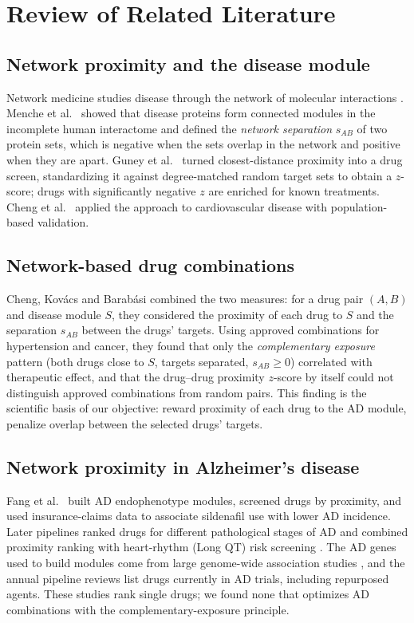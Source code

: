 \section{Review of Related Literature}
\label{sec:rrl}

\subsection{Network proximity and the disease module}

Network medicine studies disease through the network of molecular interactions \cite{barabasi2011network}. Menche et al.\ \cite{menche2015uncovering} showed that disease proteins form connected modules in the incomplete human interactome and defined the \emph{network separation} $s_{AB}$ of two protein sets, which is negative when the sets overlap in the network and positive when they are apart. Guney et al.\ \cite{guney2016network} turned closest-distance proximity into a drug screen, standardizing it against degree-matched random target sets to obtain a $z$-score; drugs with significantly negative $z$ are enriched for known treatments. Cheng et al.\ \cite{cheng2018network} applied the approach to cardiovascular disease with population-based validation.

\subsection{Network-based drug combinations}

Cheng, Kov\'acs and Barab\'asi \cite{cheng2019combinations} combined the two measures: for a drug pair $(A,B)$ and disease module $S$, they considered the proximity of each drug to $S$ and the separation $s_{AB}$ between the drugs' targets. Using approved combinations for hypertension and cancer, they found that only the \emph{complementary exposure} pattern (both drugs close to $S$, targets separated, $s_{AB}\ge 0$) correlated with therapeutic effect, and that the drug--drug proximity $z$-score by itself could not distinguish approved combinations from random pairs. This finding is the scientific basis of our objective: reward proximity of each drug to the AD module, penalize overlap between the selected drugs' targets.

\subsection{Network proximity in Alzheimer's disease}

Fang et al.\ \cite{fang2021sildenafil} built AD endophenotype modules, screened drugs by proximity, and used insurance-claims data to associate sildenafil use with lower AD incidence. Later pipelines ranked drugs for different pathological stages of AD \cite{csbj2023stages} and combined proximity ranking with heart-rhythm (Long QT) risk screening \cite{lqt2025ad}. The AD genes used to build modules come from large genome-wide association studies \cite{bellenguez2022new}, and the annual pipeline reviews \cite{cummings2025pipeline,cummings2026pipeline} list drugs currently in AD trials, including repurposed agents. These studies rank single drugs; we found none that optimizes AD combinations with the complementary-exposure principle.

